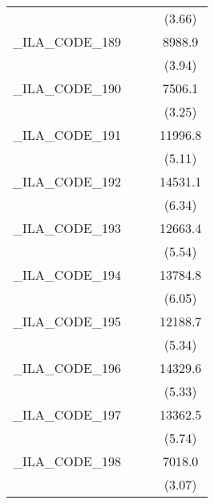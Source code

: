 {\begin{tabular}{l*{3}{c}}
            &                     &                     &      (3.66)         \\
[1em]
\_ILA\_CODE\_189&                     &                     &      8988.9\sym{***}\\
            &                     &                     &      (3.94)         \\
[1em]
\_ILA\_CODE\_190&                     &                     &      7506.1\sym{**} \\
            &                     &                     &      (3.25)         \\
[1em]
\_ILA\_CODE\_191&                     &                     &     11996.8\sym{***}\\
            &                     &                     &      (5.11)         \\
[1em]
\_ILA\_CODE\_192&                     &                     &     14531.1\sym{***}\\
            &                     &                     &      (6.34)         \\
[1em]
\_ILA\_CODE\_193&                     &                     &     12663.4\sym{***}\\
            &                     &                     &      (5.54)         \\
[1em]
\_ILA\_CODE\_194&                     &                     &     13784.8\sym{***}\\
            &                     &                     &      (6.05)         \\
[1em]
\_ILA\_CODE\_195&                     &                     &     12188.7\sym{***}\\
            &                     &                     &      (5.34)         \\
[1em]
\_ILA\_CODE\_196&                     &                     &     14329.6\sym{***}\\
            &                     &                     &      (5.33)         \\
[1em]
\_ILA\_CODE\_197&                     &                     &     13362.5\sym{***}\\
            &                     &                     &      (5.74)         \\
[1em]
\_ILA\_CODE\_198&                     &                     &      7018.0\sym{**} \\
            &                     &                     &      (3.07)         \\

\end{tabular}}
